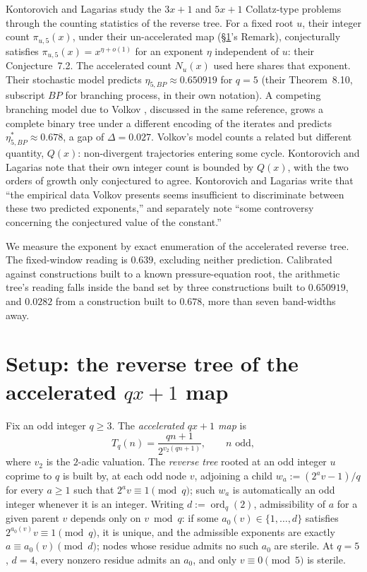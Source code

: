 \documentclass[11pt]{article}
\theoremstyle{remark}
\DeclareMathOperator{\ord}{ord}
\begin{document}
Kontorovich and Lagarias \cite{KontorovichLagarias2009} study the
$3x+1$ and $5x+1$ Collatz-type problems through the counting statistics
of the reverse tree. For a fixed root $u$, their integer count
$\pi_{u,5}(x)$, under their un-accelerated map (\S\ref{sec:setup}'s
Remark), conjecturally satisfies $\pi_{u,5}(x)=x^{\eta+o(1)}$ for an
exponent $\eta$ independent of $u$: their Conjecture~7.2. The
accelerated count $N_u(x)$ used here shares that exponent. Their
stochastic model predicts $\eta_{5,BP}\approx0.650919$ for $q=5$ (their
Theorem~8.10, subscript $BP$ for branching process, in their own
notation). A competing branching model due to
Volkov \cite{Volkov2006}, discussed in the same reference, grows a
complete binary tree under a different encoding of the iterates and
predicts $\eta^\ast_{5,BP}\approx0.678$, a gap of $\Delta=0.027$.
Volkov's model counts a related but different quantity, $Q(x)$:
non-divergent trajectories entering some cycle. Kontorovich and Lagarias
note that their own integer count is bounded by $Q(x)$, with the two
orders of growth only conjectured to agree. Kontorovich and Lagarias write that ``the empirical data Volkov
presents seems insufficient to discriminate between these two predicted
exponents,'' and separately note ``some controversy concerning the
conjectured value of the constant.''

We measure the exponent by exact enumeration of the accelerated reverse
tree. The fixed-window reading is $0.639$, excluding neither
prediction. Calibrated against constructions built to a known
pressure-equation root, the arithmetic tree's reading falls inside the
band set by three constructions built to $0.650919$, and $0.0282$ from
a construction built to $0.678$, more than seven band-widths away.

\section{Setup: the reverse tree of the accelerated $qx+1$ map}
\label{sec:setup}

Fix an odd integer $q\ge3$. The \emph{accelerated $qx+1$ map} is
\[
  T_q(n) = \frac{qn+1}{2^{v_2(qn+1)}}, \qquad n \text{ odd},
\]
where $v_2$ is the $2$-adic valuation. The \emph{reverse tree} rooted
at an odd integer $u$ coprime to $q$ is built by, at each odd node
$v$, adjoining a child $w_a := (2^a v - 1)/q$ for every $a\ge1$ such
that $2^a v\equiv1\pmod q$; such $w_a$ is automatically an odd integer
whenever it is an integer. Writing $d:=\ord_q(2)$, admissibility of
$a$ for a given parent $v$ depends only on $v\bmod q$: if some
$a_0(v)\in\{1,\dots,d\}$ satisfies $2^{a_0(v)}v\equiv1\pmod q$, it is
unique, and the admissible exponents are exactly $a\equiv a_0(v)\pmod
d$; nodes whose residue admits no such $a_0$ are sterile. At $q=5$,
$d=4$, every nonzero residue admits an $a_0$, and only $v\equiv0\pmod5$
is sterile.
\end{document}
